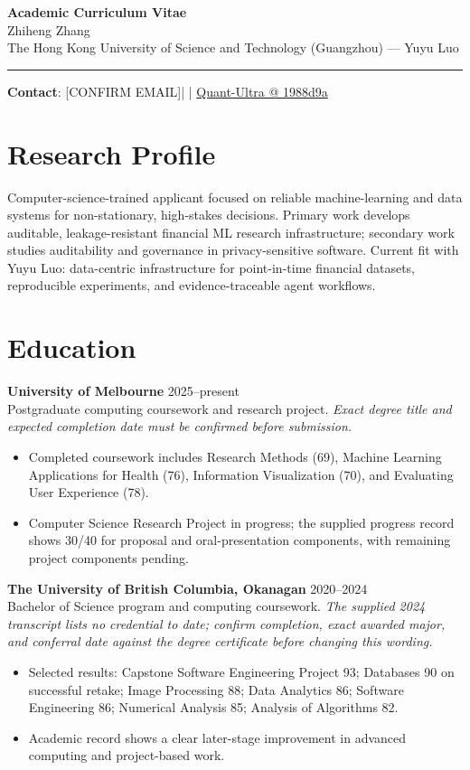 \documentclass[11pt]{article}
\makeatletter
\newcommand{\ApplicantName}{Zhiheng Zhang}
\newcommand{\ApplicantEmail}{[CONFIRM EMAIL]}
\newcommand{\ApplicantPhone}{[CONFIRM PHONE]}
\newcommand{\ApplicantGitHub}{\href{https://github.com/zhiheng-zhang-Mera/Quant-Ultra/tree/1988d9a8530da91a8158de864d098ea869098923}{Quant-Ultra @ 1988d9a}}
\makeatother
\begin{document}
\begin{center}
{\LARGE\bfseries Academic Curriculum Vitae}\\[0.25em]
{\large \ApplicantName}\\
The Hong Kong University of Science and Technology (Guangzhou) --- Yuyu Luo
\end{center}
\vspace{0.35em}\hrule\vspace{0.65em}

\textbf{Contact}: \ApplicantEmail\quad | \quad \ApplicantPhone\quad | \quad \ApplicantGitHub

\section*{Research Profile}
Computer-science-trained applicant focused on reliable machine-learning and data systems for non-stationary, high-stakes decisions. Primary work develops auditable, leakage-resistant financial ML research infrastructure; secondary work studies auditability and governance in privacy-sensitive software. Current fit with Yuyu Luo: data-centric infrastructure for point-in-time financial datasets, reproducible experiments, and evidence-traceable agent workflows.

\section*{Education}
\textbf{University of Melbourne} \hfill 2025--present\\
Postgraduate computing coursework and research project. \textit{Exact degree title and expected completion date must be confirmed before submission.}
\begin{itemize}
\item Completed coursework includes Research Methods (69), Machine Learning Applications for Health (76), Information Visualization (70), and Evaluating User Experience (78).
\item Computer Science Research Project in progress; the supplied progress record shows 30/40 for proposal and oral-presentation components, with remaining project components pending.
\end{itemize}

\textbf{The University of British Columbia, Okanagan} \hfill 2020--2024\\
Bachelor of Science program and computing coursework. \textit{The supplied 2024 transcript lists no credential to date; confirm completion, exact awarded major, and conferral date against the degree certificate before changing this wording.}
\begin{itemize}
\item Selected results: Capstone Software Engineering Project 93; Databases 90 on successful retake; Image Processing 88; Data Analytics 86; Software Engineering 86; Numerical Analysis 85; Analysis of Algorithms 82.
\item Academic record shows a clear later-stage improvement in advanced computing and project-based work.
\end{itemize}
\end{document}
